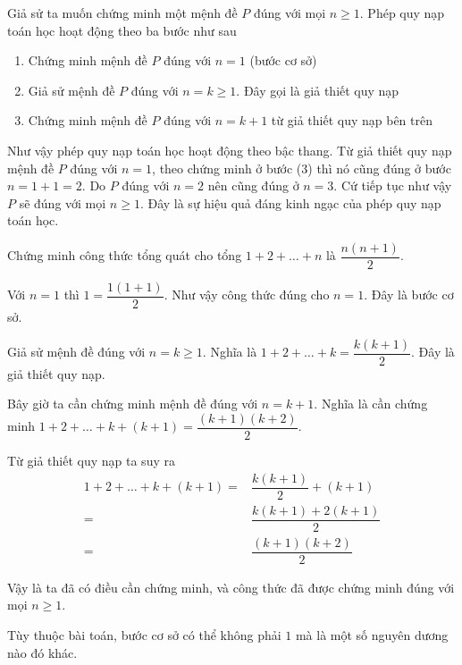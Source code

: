 Giả sử ta muốn chứng minh một mệnh đề $P$ đúng với mọi $n \geqslant 1$. Phép quy nạp toán học hoạt động theo ba bước như sau

\begin{enumerate}
	\item Chứng minh mệnh đề $P$ đúng với $n=1$ (bước cơ sở)
	\item Giả sử mệnh đề $P$ đúng với $n = k \geqslant 1$. Đây gọi là giả thiết quy nạp
	\item Chứng minh mệnh đề $P$ đúng với $n = k+1$ từ giả thiết quy nạp bên trên
\end{enumerate}

Như vậy phép quy nạp toán học hoạt động theo bậc thang. Từ giả thiết quy nạp mệnh đề $P$ đúng với $n = 1$, theo chứng minh ở bước (3) thì nó cũng đúng ở bước $n = 1+1 = 2$. Do $P$ đúng với $n=2$ nên cũng đúng ở $n=3$. Cứ tiếp tục như vậy $P$ sẽ đúng với mọi $n \geqslant 1$. Đây là sự hiệu quả đáng kinh ngạc của phép quy nạp toán học.

\begin{example}
	Chứng minh công thức tổng quát cho tổng $1 + 2 + \ldots + n$ là $\dfrac{n(n+1)}{2}$.
	
	Với $n = 1$ thì $1 = \dfrac{1 (1 + 1)}{2}$. Như vậy công thức đúng cho $n = 1$. Đây là bước cơ sở.
	
	Giả sử mệnh đề đúng với $n = k \geqslant 1$. Nghĩa là $1 + 2 + \ldots + k = \dfrac{k(k+1)}{2}$. Đây là giả thiết quy nạp.
	
	Bây giờ ta cần chứng minh mệnh đề đúng với $n = k+1$. Nghĩa là cần chứng minh $1 + 2 + \ldots + k + (k+1) = \dfrac{(k+1)(k+2)}{2}$.
	
	Từ giả thiết quy nạp ta suy ra
	\begin{align*}
		1 + 2 + \ldots + k + (k+1) = & \dfrac{k(k+1)}{2} + (k+1) \\ = & \dfrac{k(k+1) + 2(k+1)}{2} \\ = & \dfrac{(k+1)(k+2)}{2}
	\end{align*}
	
	Vậy là ta đã có điều cần chứng minh, và công thức đã được chứng minh đúng với mọi $n \geqslant 1$.
\end{example}

\begin{remark}
	Tùy thuộc bài toán, bước cơ sở có thể không phải $1$ mà là một số nguyên dương nào đó khác.
\end{remark}